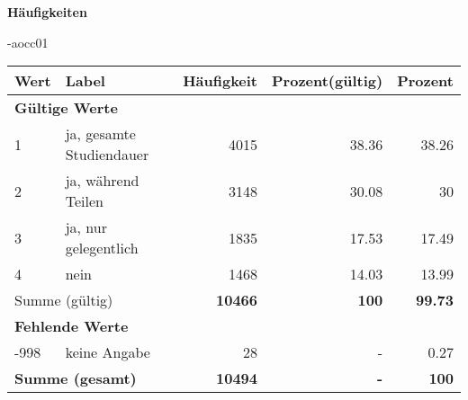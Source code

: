         		\vspace*{0.5cm}
                \noindent\textbf{Häufigkeiten}

                \vspace*{-\baselineskip}
					\begin{filecontents}{\jobname-aocc01}
					\begin{longtable}{lXrrr}
					\toprule
					\textbf{Wert} & \textbf{Label} & \textbf{Häufigkeit} & \textbf{Prozent(gültig)} & \textbf{Prozent} \\
					\endhead
					\midrule
					\multicolumn{5}{l}{\textbf{Gültige Werte}}\\

					1 &
					\multicolumn{1}{X}{ ja, gesamte Studiendauer   } &


					  \num{4015} &
					  \num[round-mode=places,round-precision=2]{38,36} &
					    \num[round-mode=places,round-precision=2]{38,26} \\

					2 &
					\multicolumn{1}{X}{ ja, während Teilen   } &


					  \num{3148} &
					  \num[round-mode=places,round-precision=2]{30,08} &
					    \num[round-mode=places,round-precision=2]{30} \\

					3 &
					\multicolumn{1}{X}{ ja, nur gelegentlich   } &


					  \num{1835} &
					  \num[round-mode=places,round-precision=2]{17,53} &
					    \num[round-mode=places,round-precision=2]{17,49} \\

					4 &
					\multicolumn{1}{X}{ nein   } &


					  \num{1468} &
					  \num[round-mode=places,round-precision=2]{14,03} &
					    \num[round-mode=places,round-precision=2]{13,99} \\
					\midrule
					\multicolumn{2}{l}{Summe (gültig)} &
					  \textbf{\num{10466}} &
					\textbf{100} &
					  \textbf{\num[round-mode=places,round-precision=2]{99,73}} \\
					\multicolumn{5}{l}{\textbf{Fehlende Werte}}\\
							-998 &
							keine Angabe &
							  \num{28} &
							 - &
							  \num[round-mode=places,round-precision=2]{0,27} \\
					\midrule
					\multicolumn{2}{l}{\textbf{Summe (gesamt)}} &
				      \textbf{\num{10494}} &
				    \textbf{-} &
				    \textbf{100} \\
					\bottomrule
					\end{longtable}
					\end{filecontents}
